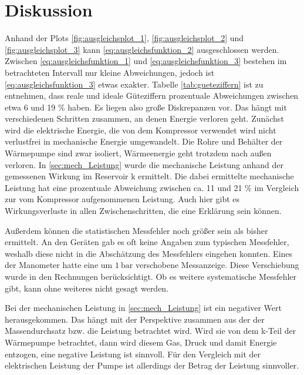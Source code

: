 \section{Diskussion}
Anhand der Plots \ref{fig:ausgleichsplot_1}, \ref{fig:ausgleichsplot_2} und \ref{fig:ausgleichsplot_3}
kann \eqref{eq:ausgleichsfunktion_2} ausgeschlossen werden. 
Zwischen \eqref{eq:ausgleichsfunktion_1} und \eqref{eq:ausgleichsfunktion_3} bestehen im betrachteten Intervall nur kleine Abweichungen,
jedoch ist \eqref{eq:ausgleichsfunktion_3} etwas exakter.
Tabelle \ref{tab:gueteziffern} ist zu entnehmen, dass reale und ideale Güteziffern prozentuale Abweichungen zwischen etwa
6 und 19 \% haben.
Es liegen also große Diskrepanzen vor.
Das hängt mit verschiedenen Schritten zusammen, an denen Energie verloren geht.
Zunächst wird die elektrische Energie, die von dem Kompressor verwendet wird
nicht verlustfrei in mechanische Energie umgewandelt.
Die Rohre und Behälter der Wärmepumpe sind zwar isoliert, 
Wärmeenergie geht trotzdem nach außen verloren.
In \ref{sec:mech_Leistung} wurde die mechanische Leistung anhand der gemessenen Wirkung im Reservoir k ermittelt.
Die dabei ermittelte mechanische Leistung hat eine prozentuale Abweichung zwischen ca. 11 und 21 \% im Vergleich zur
vom Kompressor aufgenommenen Leistung.
Auch hier gibt es Wirkungsverluste in allen Zwischenschritten, die eine Erklärung sein können.

\noindent
Außerdem können die statistischen Messfehler noch größer sein als bisher ermittelt.
An den Geräten gab es oft keine Angaben zum typischen Messfehler,
weshalb diese nicht in die Abschätzung des Messfehlers eingehen konnten.
Eines der Manometer hatte eine um $\qty{1}{\bar}$ verschobene Messanzeige.
Diese Verschiebung wurde in den Rechnungen berücksichtigt.
Ob es weitere systematische Messfehler gibt, kann ohne weiteres nicht gesagt werden.

\noindent
Bei der mechanischen Leistung in \ref{sec:mech_Leistung} ist ein negativer Wert herausgekommen. 
Das hängt mit der Perspektive zusammen aus der der Massendurchsatz bzw. die Leistung betrachtet wird.
Wird sie von dem k-Teil der Wärmepumpe betrachtet, dann wird diesem Gas, Druck und damit Energie entzogen,
eine negative Leistung ist sinnvoll.
Für den Vergleich mit der elektrischen Leistung der Pumpe ist allerdings der Betrag der Leistung sinnvoller.